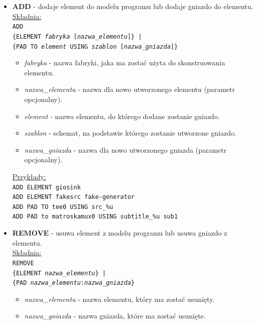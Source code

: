 \documentclass[12pt]{article}
\begin{document}
\begin{itemize}
  \setlength{\itemsep}{0em}
\item \textbf{ADD} - dodaje element do modelu programu lub dodaje gniazdo do elementu.
\underline{Składnia:} \\
\texttt{ADD \\
\hspace*{2em} \{ELEMENT \textit{fabryka} [\textit{nazwa\_elementu}]\} | \\
\hspace*{2em} \{PAD TO \textit{element} USING \textit{szablon} [\textit{nazwa\_gniazda}]\} }
\begin{itemize}
\item \textit{fabryka} - nazwa fabryki, jaka ma zostać użyta do skonstruowania elementu.
\item \textit{nazwa\_elementu} - nazwa dla nowo utworzonego elementu (parametr opcjonalny).
\item \textit{element} - nazwa elementu, do którego dodane zostanie gniazdo.
\item \textit{szablon} - schemat, na podstawie którego zostanie utworzone gniazdo.
\item \textit{nazwa\_gniazda} - nazwa dla nowo utworzonego gniazda (parametr opcjonalny).
\end{itemize}
\underline{Przykłady:} \\
\texttt{ADD ELEMENT giosink} \\
\texttt{ADD ELEMENT fakesrc fake-generator} \\
\texttt{ADD PAD TO tee0 USING src\_\%u} \\
\texttt{ADD PAD to matroskamux0 USING subtitle\_\%u sub1}
\item \textbf{REMOVE} - usuwa element z modelu programu lub usuwa gniazdo z elementu. \\
\underline{Składnia:} \\
\texttt{REMOVE \\
\hspace*{2em} \{ELEMENT \textit{nazwa\_elementu}\} | \\
\hspace*{2em} \{PAD \textit{nazwa\_elementu}:\textit{nazwa\_gniazda}\}}
\begin{itemize}
\item \textit{nazwa\_elementu} - nazwa elementu, który ma zostać usunięty.
\item \textit{nazwa\_gniazda} - nazwa gniazda, które ma zostać usunięte.
\end{itemize}

\end{itemize}
\end{document}

